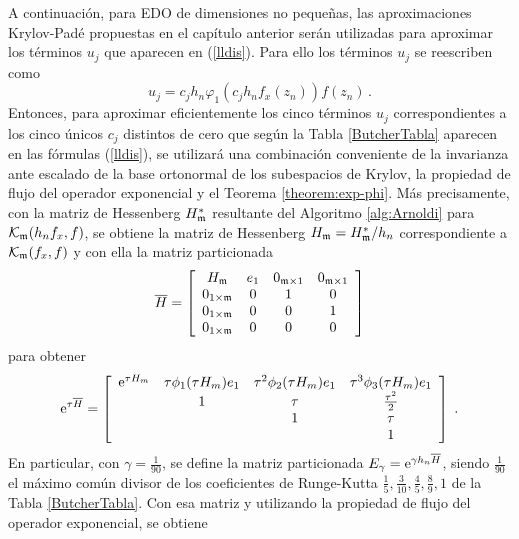 A continuación, para EDO de dimensiones no pequeñas, las aproximaciones Krylov-Padé propuestas en el capítulo anterior serán utilizadas para aproximar los términos $u_j$ que aparecen en (\ref{lldis}). Para ello los términos $u_j$ se reescriben como
\begin{equation}
	u_j= c_jh_n\varphi_1(c_jh_nf_x(z_n))f(z_n) \label{u-j-deff}\,.
\end{equation}
 Entonces, para aproximar eficientemente los cinco términos $u_j$ correspondientes a los cinco únicos $c_j$ distintos de cero que según la Tabla \ref{ButcherTabla} aparecen en las fórmulas (\ref{lldis}), se utilizará una combinación conveniente de la invarianza ante escalado de la base ortonormal de los subespacios de Krylov, la propiedad de flujo del operador exponencial y el Teorema \ref{theorem:exp-phi}. Más precisamente, con la matriz de Hessenberg $H^*_{\mathfrak{m}}$ resultante del Algoritmo \ref{alg:Arnoldi} para $\mathcal{K}_{\mathfrak{m}}(h_nf_x,f)$, se obtiene la matriz de Hessenberg $H_{\mathfrak{m}}=H^*_{\mathfrak{m}}/h_n$ correspondiente a $\mathcal{K}_{\mathfrak{m}}(f_x,f)$ y con ella la matriz particionada
\begin{equation}
    \overline{H} = \left[\begin{array}{cccc}
    H_{\mathfrak{m}} & e_1 & 0_{\mathfrak{m}\times 1} & 0_{\mathfrak{m}\times 1}\\
    0_{1\times\mathfrak{m}} & 0 & 1 & 0\\
    0_{1\times\mathfrak{m}} & 0 & 0 & 1\\
    0_{1\times\mathfrak{m}} & 0 & 0 & 0
    \end{array}\right] \label{hhat}
\end{equation}
para obtener
\begin{equation}
    \mathrm{e}^{\tau\overline{H}} = \left[\begin{array}{cccc}
    \mathrm{e}^{\tau H_m} & \tau\phi_1(\tau H_m)e_1 & \tau^{2}\phi_2(\tau H_m)e_1 &
    \tau^{3}\phi_3(\tau H_m)e_1 \\
    & 1 & \tau & \frac{\tau^{2}}{2}\\
    &  & 1 & \tau \\
    &   &   & 1 \\
    \end{array}\right]\;. \label{phi_hhat}
\end{equation}
En particular, con $\gamma=\frac{1}{90}$, se define la matriz particionada $E_\gamma=\mathrm{e}^{\gamma h_n\overline{H}}$, siendo $\frac{1}{ 90}$ el máximo común divisor de los coeficientes de Runge-Kutta $\frac{1}{5},\frac{3}{10},\frac{4}{5},\frac{8}{9} ,1$ de la Tabla \ref{ButcherTabla}. Con esa matriz y utilizando la propiedad de flujo del operador exponencial, se obtiene
